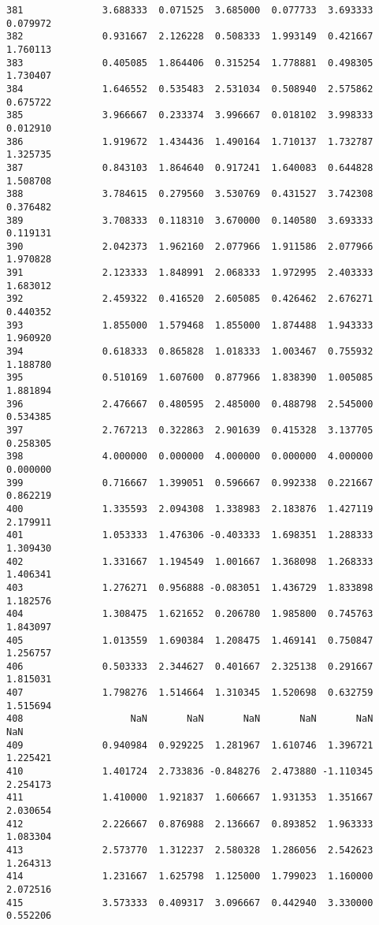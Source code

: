 \documentclass[11pt]{article}
\begin{document}
\begin{Verbatim}[commandchars=\\\{\}]
381              3.688333  0.071525  3.685000  0.077733  3.693333  0.079972
382              0.931667  2.126228  0.508333  1.993149  0.421667  1.760113
383              0.405085  1.864406  0.315254  1.778881  0.498305  1.730407
384              1.646552  0.535483  2.531034  0.508940  2.575862  0.675722
385              3.966667  0.233374  3.996667  0.018102  3.998333  0.012910
386              1.919672  1.434436  1.490164  1.710137  1.732787  1.325735
387              0.843103  1.864640  0.917241  1.640083  0.644828  1.508708
388              3.784615  0.279560  3.530769  0.431527  3.742308  0.376482
389              3.708333  0.118310  3.670000  0.140580  3.693333  0.119131
390              2.042373  1.962160  2.077966  1.911586  2.077966  1.970828
391              2.123333  1.848991  2.068333  1.972995  2.403333  1.683012
392              2.459322  0.416520  2.605085  0.426462  2.676271  0.440352
393              1.855000  1.579468  1.855000  1.874488  1.943333  1.960920
394              0.618333  0.865828  1.018333  1.003467  0.755932  1.188780
395              0.510169  1.607600  0.877966  1.838390  1.005085  1.881894
396              2.476667  0.480595  2.485000  0.488798  2.545000  0.534385
397              2.767213  0.322863  2.901639  0.415328  3.137705  0.258305
398              4.000000  0.000000  4.000000  0.000000  4.000000  0.000000
399              0.716667  1.399051  0.596667  0.992338  0.221667  0.862219
400              1.335593  2.094308  1.338983  2.183876  1.427119  2.179911
401              1.053333  1.476306 -0.403333  1.698351  1.288333  1.309430
402              1.331667  1.194549  1.001667  1.368098  1.268333  1.406341
403              1.276271  0.956888 -0.083051  1.436729  1.833898  1.182576
404              1.308475  1.621652  0.206780  1.985800  0.745763  1.843097
405              1.013559  1.690384  1.208475  1.469141  0.750847  1.256757
406              0.503333  2.344627  0.401667  2.325138  0.291667  1.815031
407              1.798276  1.514664  1.310345  1.520698  0.632759  1.515694
408                   NaN       NaN       NaN       NaN       NaN       NaN
409              0.940984  0.929225  1.281967  1.610746  1.396721  1.225421
410              1.401724  2.733836 -0.848276  2.473880 -1.110345  2.254173
411              1.410000  1.921837  1.606667  1.931353  1.351667  2.030654
412              2.226667  0.876988  2.136667  0.893852  1.963333  1.083304
413              2.573770  1.312237  2.580328  1.286056  2.542623  1.264313
414              1.231667  1.625798  1.125000  1.799023  1.160000  2.072516
415              3.573333  0.409317  3.096667  0.442940  3.330000  0.552206

\end{Verbatim}
\end{document}
